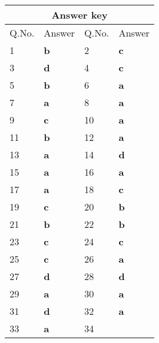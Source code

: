 \setlength\arrayrulewidth{1pt}
\begin{table}[H]
	\centering
	\begin{tabular}{|p{1.5cm}|p{1.5cm}||p{1.5cm}|p{1.5cm}|}
		\hline
		\multicolumn{4}{|c|}{\textbf{Answer key}}\\\hline\hline
		\rowcolor{ocrel}Q.No.&Answer&Q.No.&Answer\\\hline
		1&\textbf{b} &2&\textbf{c}\\\hline 
		3&\textbf{d} &4&\textbf{c} \\\hline
		5&\textbf{b} &6&\textbf{a} \\\hline
		7&\textbf{a}&8&\textbf{a}\\\hline
		9&\textbf{c}&10&\textbf{a}\\\hline
		11&\textbf{b} &12&\textbf{a}\\\hline
		13&\textbf{a}&14&\textbf{d}\\\hline
		15&\textbf{a}&16&\textbf{a} \\\hline
		17&\textbf{a}&18&\textbf{c}\\\hline
		19&\textbf{c}&20&\textbf{b}\\\hline
		21&\textbf{b} &22&\textbf{b}\\\hline
		23&\textbf{c}&24&\textbf{c}\\\hline
		25&\textbf{c}&26&\textbf{a} \\\hline
		27&\textbf{d}&28&\textbf{d}\\\hline
		29&\textbf{a}&30&\textbf{a}\\\hline
		31&\textbf{d}&32&\textbf{a}\\\hline
		33&\textbf{a}&34&\textbf{}\\\hline
	\end{tabular}
\end{table}